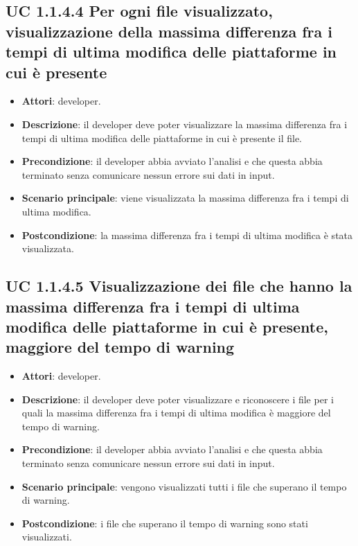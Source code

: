 	\subsection{UC 1.1.4.4 Per ogni file visualizzato, visualizzazione della massima differenza fra i tempi di ultima modifica delle piattaforme in cui è presente}
		\label{subsec:UC1.1.4.4}
	
		\begin{itemize}
			\item\textbf{Attori}: developer.
			\item\textbf{Descrizione}: il developer deve poter visualizzare la massima differenza fra i tempi di ultima modifica delle piattaforme in cui è presente il file.
			\item\textbf{Precondizione}: il developer abbia avviato l'analisi e che questa abbia terminato senza comunicare nessun errore sui dati in input.
			\item\textbf{Scenario principale}: viene visualizzata la massima differenza fra i tempi di ultima modifica.
			\item\textbf{Postcondizione}: la massima differenza fra i tempi di ultima modifica è stata visualizzata.
		\end{itemize}
		
	\subsection{UC 1.1.4.5 Visualizzazione dei file che hanno la massima differenza fra i tempi di ultima modifica delle piattaforme in cui è presente, maggiore del tempo di warning}
		\label{subsec:UC1.1.4.5}
	
		\begin{itemize}
			\item\textbf{Attori}: developer.
			\item\textbf{Descrizione}: il developer deve poter visualizzare e riconoscere i file per i quali la massima differenza fra i tempi di ultima modifica è maggiore del tempo di warning.
			\item\textbf{Precondizione}: il developer abbia avviato l'analisi e che questa abbia terminato senza comunicare nessun errore sui dati in input.
			\item\textbf{Scenario principale}: vengono visualizzati tutti i file che superano il tempo di warning.
			\item\textbf{Postcondizione}: i file che superano il tempo di warning sono stati visualizzati.
		\end{itemize}
			
